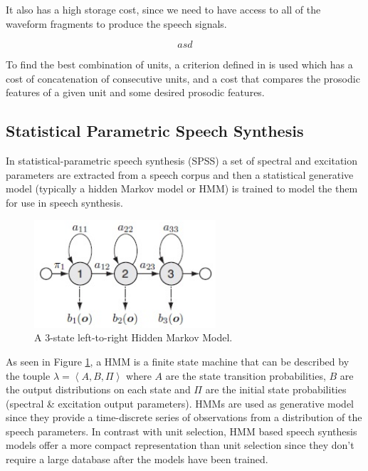 It also has a high storage cost, since we need to have access to all of the waveform fragments to produce the speech signals.

\begin{equation}
    asd
    \label{eq:units}
\end{equation}

To find the best combination of units, a criterion defined in \cite{hunt1996unit} is used which has a cost of concatenation of consecutive units, and a cost that compares the prosodic features of a given unit and some desired prosodic features.

\subsection{Statistical Parametric Speech Synthesis}

In statistical-parametric speech synthesis (SPSS) a set of spectral and excitation parameters are extracted from a speech corpus and then a statistical generative model (typically a hidden Markov model or HMM) is trained to model the them for use in speech synthesis.

\begin{figure}[h]
    \centering
    \includegraphics[height=4cm]{figures/hmm}
    \caption{A 3-state left-to-right Hidden Markov Model.}
    \label{fig:hmm}
\end{figure}

As seen in Figure \ref{fig:hmm}, a HMM is a finite state machine that can be described by the touple $\lambda = \left < A, B, \Pi \right >$ where $A$ are the state transition probabilities, $B$ are the output distributions on each state and $\Pi$ are the initial state probabilities (spectral \& excitation output parameters). HMMs are used as generative model since they provide a time-discrete series of observations from a distribution of the speech parameters. In contrast with unit selection, HMM based speech synthesis models offer a more compact representation than unit selection since they don't require a large database after the models have been trained.

